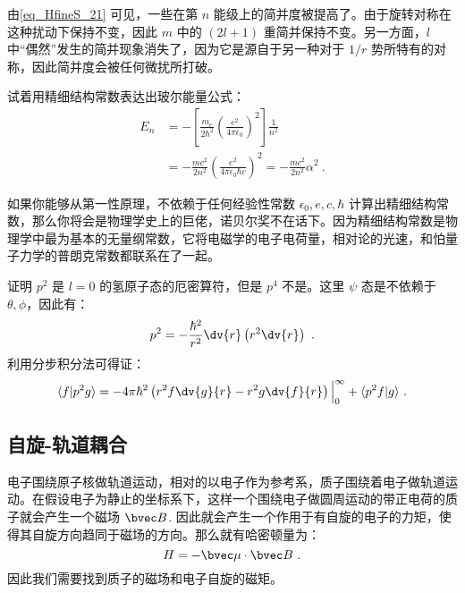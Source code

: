由\autoref{eq_HfineS_21} 可见，一些在第 $n$ 能级上的简并度被提高了。由于旋转对称在这种扰动下保持不变，因此 $m$ 中的 $(2l+1)$ 重简并保持不变。另一方面，$l$ 中“偶然”发生的简并现象消失了，因为它是源自于另一种对于 $1/r$ 势所特有的对称，因此简并度会被任何微扰所打破。
\begin{example}{}
试着用精细结构常数表达出玻尔能量公式：
\begin{align}
E_n&=-\left[\frac {m_e}{2\hbar^{2}} \left(\frac {e^ {2}}{4\pi \epsilon_0}\right)^ {2}\right]  \frac {1}{n^2}\\
&=-\frac{mc^2}{2n^2}\left(\frac {e^{2}}{4\pi \epsilon_0\hbar c}\right)^2=-\frac{mc^2}{2n^2}\alpha^2~.
\end{align}
\end{example}

如果你能够从第一性原理，不依赖于任何经验性常数 $\epsilon_0,e,c,\hbar$ 计算出精细结构常数，那么你将会是物理学史上的巨佬，诺贝尔奖不在话下。因为精细结构常数是物理学中最为基本的无量纲常数，它将电磁学的电子电荷量，相对论的光速，和怕量子力学的普朗克常数都联系在了一起。

\begin{example}{}
证明 $p^2$ 是 $l=0$ 的氢原子态的厄密算符，但是 $p^4$ 不是。这里 $\psi$ 态是不依赖于 $\theta,\phi$，因此有：
\begin{equation}
p^2=-\frac{\hbar^2}{r^2}\dv{r}\left(r^2\dv{r}\right)~.
\end{equation}
利用分步积分法可得证：
\begin{equation}
\langle f|p^2g\rangle = -4\pi\hbar^2\left(r^2f\dv{g}{r}-r^2g\dv{f}{r}\right)\Big|_0^\infty+\langle p^2f|g\rangle~.
\end{equation}

\end{example}
\subsection{自旋-轨道耦合}
电子围绕原子核做轨道运动，相对的以电子作为参考系，质子围绕着电子做轨道运动。在假设电子为静止的坐标系下，这样一个围绕电子做圆周运动的带正电荷的质子就会产生一个磁场 $\bvec B$. 因此就会产生一个作用于有自旋的电子的力矩，使得其自旋方向趋同于磁场的方向。那么就有哈密顿量为：
\begin{equation}\label{eq_HfineS_26}
H=-\bvec\mu \cdot \bvec B~.
\end{equation}
因此我们需要找到质子的磁场和电子自旋的磁矩。

